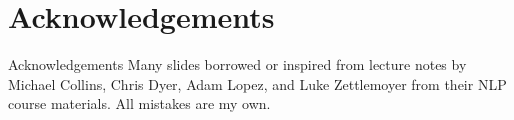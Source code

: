 
\section*{Acknowledgements}

\begin{frame}
\centering
\begin{alertblock}{Acknowledgements}
Many slides borrowed or inspired from lecture notes by Michael Collins, Chris Dyer, Adam Lopez, and Luke Zettlemoyer from their NLP course materials. All mistakes are my own.
\end{alertblock}
\end{frame}


